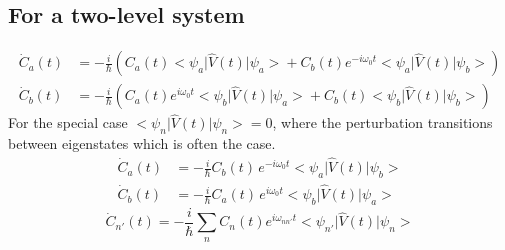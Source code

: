 \documentclass[12pt,fancychapters]{report}
\numberwithin{equation}{section}
\begin{document}
\subsection{For a two-level system}
\begin{align*}
  \dot{C}_a (t) &= -\frac{i}{\hbar}\left(C_a(t)\big<\psi_a\big|\hat{V}(t)\big|\psi_a\big>
  + C_b(t) e^{-i\omega_0 t}\big<\psi_a\big|\hat{V}(t)\big|\psi_b\big>\right)\\
    \dot{C}_b(t) &= -\frac{i}{\hbar} \left(C_a(t)e^{i\omega_0 t}\big<\psi_b\big|\hat{V}(t)
  \big|\psi_a\big> + C_b (t)\big<\psi_b\big|\hat{V}(t)\big|\psi_b\big>\right)
    \end{align*}
For the special case $\big<\psi_n\big|\hat{V}(t)\big|\psi_n\big> = 0$, where the perturbation 
transitions between eigenstates which is often the case. 
\begin{align*}
  \dot{C}_a(t) &= -\frac{i}{\hbar}C_b(t)\,e^{-i\omega_0 t}\big<\psi_a\big|\hat{V}(t)\big|\psi_b
  \big>\\
\dot{C}_b(t) &= -\frac{i}{\hbar}C_a(t)\,e^{i\omega_0 t}\big<\psi_b\big|\hat{V}(t)\big|\psi_a
  \big>
\end{align*}
\[\boxed{
    \dot{C}_{n'}(t) = -\frac{i}{\hbar}\sum_n C_n(t)e^{i\omega_{nn'}t}\big<\psi_{n'}\big|
    \hat{V}(t)\big|\psi_n\big> 
}\]
\end{document}
